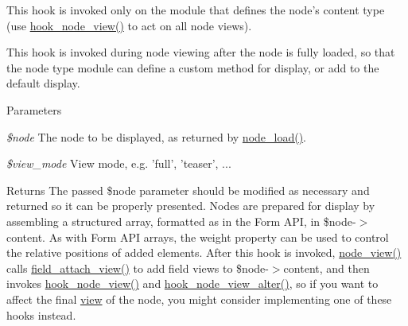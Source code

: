 This hook is invoked only on the module that defines the node's content type (use \hyperlink{group__node__api__hooks_ga475290ee8e81a2373ea17c512cc3f9a9}{hook\_\-node\_\-view()} to act on all node views).

This hook is invoked during node viewing after the node is fully loaded, so that the node type module can define a custom method for display, or add to the default display.


\begin{DoxyParams}{Parameters}
\item[{\em \$node}]The node to be displayed, as returned by \hyperlink{node_8module_a492ddfc12843e71242bb484a44e51a19}{node\_\-load()}. \item[{\em \$view\_\-mode}]View mode, e.g. 'full', 'teaser', ... \end{DoxyParams}
\begin{DoxyReturn}{Returns}
The passed \$node parameter should be modified as necessary and returned so it can be properly presented. Nodes are prepared for display by assembling a structured array, formatted as in the Form API, in \$node-\/$>$content. As with Form API arrays, the weight property can be used to control the relative positions of added elements. After this hook is invoked, \hyperlink{node_8module_ac2c64fdfacc25be79a6ecf406ab62320}{node\_\-view()} calls \hyperlink{group__field__attach_gaa752a8fd31173fd2308d71eb059e00c7}{field\_\-attach\_\-view()} to add field views to \$node-\/$>$content, and then invokes \hyperlink{group__node__api__hooks_ga475290ee8e81a2373ea17c512cc3f9a9}{hook\_\-node\_\-view()} and \hyperlink{group__node__api__hooks_gad5ece824736be57bf0020af900398b94}{hook\_\-node\_\-view\_\-alter()}, so if you want to affect the final \hyperlink{classview}{view} of the node, you might consider implementing one of these hooks instead. 
\end{DoxyReturn}
